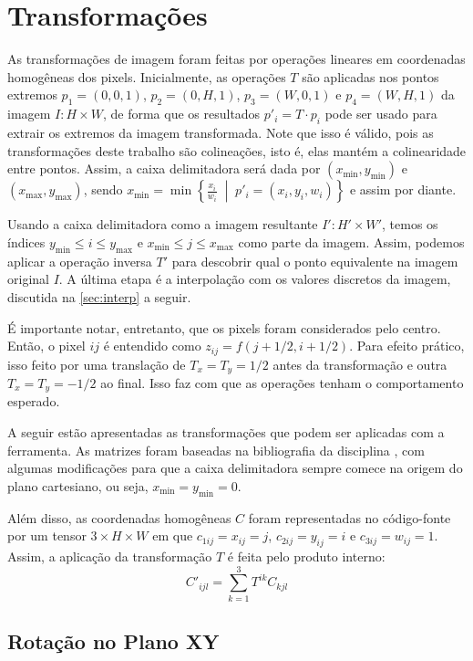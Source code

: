 \section{Transformações} \label{sec:transformacoes}

As transformações de imagem foram feitas por operações lineares em coordenadas homogêneas dos pixels. Inicialmente, as operações $T$ são aplicadas nos pontos extremos $p_1 = (0, 0, 1)$, $p_2 = (0, H, 1)$, $p_3 = (W, 0, 1)$ e $p_4 = (W, H, 1)$ da imagem $I: H \times W$, de forma que os resultados $p'_i = T \cdot p_i$ pode ser usado para extrair os extremos da imagem transformada. Note que isso é válido, pois as transformações deste trabalho são colineações, isto é, elas mantém a colinearidade entre pontos. Assim, a caixa delimitadora \autocite{bbox} será dada por $(x_{\min}, y_{\min})$ e $(x_{\max}, y_{\max})$, sendo $x_{\min} = \min\left\{ \frac{x_i}{w_i} \;\middle|\; p'_i = (x_i, y_i, w_i)\right\}$ e assim por diante.

Usando a caixa delimitadora como a imagem resultante $I': H' \times W'$, temos os índices $y_{\min} \leq i \leq y_{\max}$ e $x_{\min} \leq j \leq x_{\max}$ como parte da imagem. Assim, podemos aplicar a operação inversa $T'$ para descobrir qual o ponto equivalente na imagem original $I$. A última etapa é a interpolação com os valores discretos da imagem, discutida na \cref{sec:interp} a seguir.

É importante notar, entretanto, que os pixels foram considerados pelo centro. Então, o pixel $ij$ é entendido como $z_{ij} = f(j + 1/2, i + 1/2)$. Para efeito prático, isso feito por uma translação de $T_x = T_y = 1/2$ antes da transformação e outra $T_x = T_y = -1/2$ ao final. Isso faz com que as operações tenham o comportamento esperado.

A seguir estão apresentadas as transformações que podem ser aplicadas com a ferramenta. As matrizes foram baseadas na bibliografia da disciplina \autocite{helio}, com algumas modificações para que a caixa delimitadora sempre comece na origem do plano cartesiano, ou seja, $x_{\min} = y_{\min} = 0$.

Além disso, as coordenadas homogêneas $C$ foram representadas no código-fonte por um tensor $3 \times H \times W$ em que $c_{1ij} = x_{ij} = j$, $c_{2ij} = y_{ij} = i$ e $c_{3ij} = w_{ij} = 1$. Assim, a aplicação da transformação $T$ é feita pelo produto interno:
\[
    C'_{ijl} = \sum_{k = 1}^3 T^{ik} C_{kjl}
\]

\subsection{Rotação no Plano XY}

